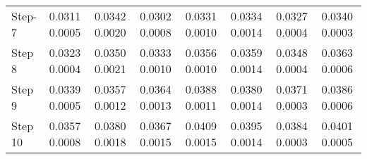 \documentclass{ieeeaccess}
\begin{document}
\begin{table*}[htbp]
\begin{tabular}{llllllll}
Step-7 & 0.0311   0.0005 & 0.0342    0.0020  & 0.0302    0.0008  &  0.0331   0.0010 &  0.0334   0.0014  &  0.0327   0.0004 & 0.0340	0.0003 \\

Step 8 &  0.0323   0.0004 & 0.0350   0.0021  & 0.0333   0.0010  &  0.0356  0.0010 &  0.0359   0.0014  &  0.0348  0.0004  & 0.0363	0.0006 \\

Step 9 &  0.0339   0.0005 & 0.0357    0.0012  & 0.0364    0.0013  &  0.0388  0.0011 &  0.0380   0.0014  &  0.0371   0.0003 & 0.0386	0.0006 \\

Step 10 &  0.0357   0.0008 & 0.0380    0.0018  & 0.0367   0.0015  &  0.0409   0.0015 &  0.0395   0.0014  &  0.0384   0.0003 & 0.0401	0.0005 \\
\hline
\end{tabular}

\end{table*}
\end{document}
